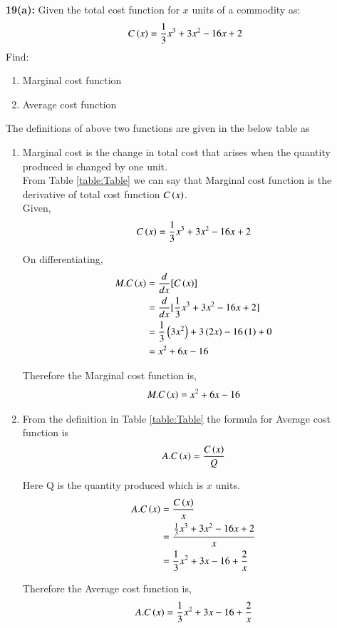 \documentclass[journal,12pt,twocolumn]{IEEEtran}
\begin{document}
\textbf{19(a):} 
   Given the total cost function for $x$ units of a commodity as:
\begin{align*}
  C\left(x\right) = \frac{1}{3}x^3 + 3x^2 - 16x +2
\end{align*}
   Find:
\begin{enumerate}[ label=(\roman*)]
\item Marginal cost function
\item Average cost function
\end{enumerate}

\solution 
The definitions of above two functions are given in the below table as
\begin{table}[!htb]
\centering

\caption{}
\label{table:Table}
\end{table} 

\begin{enumerate}[ label=(\roman*)]
\item Marginal cost is the change in total cost that arises when the quantity produced is changed by one unit.\\
From Table
\eqref{table:Table}
we can say that Marginal cost function is the derivative of total cost function $C\left(x\right)$.\\
          
Given,
\begin{align}
  C\left(x\right) = \frac{1}{3}x^3 + 3x^2 - 16x +2
\end{align}
          
On differentiating,
\begin{align}
  M.C\left(x\right) &= \frac{d}{dx} [C\left(x\right)]\\
              &= \frac{d}{dx} [\frac{1}{3}x^3 + 3x^2 - 16x +2] \\
              &= \frac{1}{3}\left(3x^2\right) + 3\left(2x\right)-16\left(1\right)+0 \\
              &= x^2+6x-16
\end{align}  
          
Therefore the Marginal cost function is,
\begin{align*}
  M.C\left(x\right)=x^2+6x-16
\end{align*}        
      
\item From the definition in Table
\eqref{table:Table}
the formula for Average cost function is
\begin{align}
  A.C\left(x\right)=\frac{C\left(x\right)}{Q}
\end{align}
         
Here Q is the quantity produced which is $x$ units.
\begin{align}
  A.C\left(x\right) &=\frac{C\left(x\right)}{x} \\
              &=\frac{\frac{1}{3}x^3 + 3x^2 - 16x +2}{x} \\
              &=\frac{1}{3}x^2 + 3x - 16 +\frac{2}{x}
\end{align}    
                  
Therefore the Average cost function is,
\begin{align*}
  A.C\left(x\right)=\frac{1}{3}x^2 + 3x - 16 +\frac{2}{x}
\end{align*}
         
\end{enumerate}
  
\end{document}
